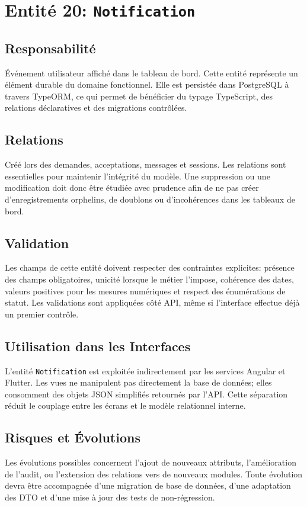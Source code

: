 \section{Entité 20: \texttt{Notification}}
\subsection{Responsabilité}
Événement utilisateur affiché dans le tableau de bord. Cette entité représente un élément durable du domaine fonctionnel. Elle est persistée dans PostgreSQL à travers TypeORM, ce qui permet de bénéficier du typage TypeScript, des relations déclaratives et des migrations contrôlées.

\subsection{Relations}
Créé lors des demandes, acceptations, messages et sessions. Les relations sont essentielles pour maintenir l'intégrité du modèle. Une suppression ou une modification doit donc être étudiée avec prudence afin de ne pas créer d'enregistrements orphelins, de doublons ou d'incohérences dans les tableaux de bord.

\subsection{Validation}
Les champs de cette entité doivent respecter des contraintes explicites: présence des champs obligatoires, unicité lorsque le métier l'impose, cohérence des dates, valeurs positives pour les mesures numériques et respect des énumérations de statut. Les validations sont appliquées côté API, même si l'interface effectue déjà un premier contrôle.

\subsection{Utilisation dans les Interfaces}
L'entité \texttt{Notification} est exploitée indirectement par les services Angular et Flutter. Les vues ne manipulent pas directement la base de données; elles consomment des objets JSON simplifiés retournés par l'API. Cette séparation réduit le couplage entre les écrans et le modèle relationnel interne.

\subsection{Risques et Évolutions}
Les évolutions possibles concernent l'ajout de nouveaux attributs, l'amélioration de l'audit, ou l'extension des relations vers de nouveaux modules. Toute évolution devra être accompagnée d'une migration de base de données, d'une adaptation des DTO et d'une mise à jour des tests de non-régression.

